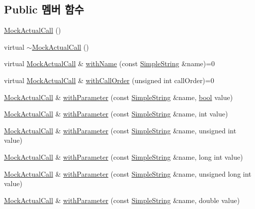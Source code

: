 \subsection*{Public 멤버 함수}
\begin{DoxyCompactItemize}
\item 
\hyperlink{class_mock_actual_call_afe40f29470502ab16ed8ae7b269017fb}{Mock\+Actual\+Call} ()
\item 
virtual \hyperlink{class_mock_actual_call_ae3abdc7c9728cc27056e182953284d1b}{$\sim$\+Mock\+Actual\+Call} ()
\item 
virtual \hyperlink{class_mock_actual_call}{Mock\+Actual\+Call} \& \hyperlink{class_mock_actual_call_a183802278da5087fb62bbdcca7792e36}{with\+Name} (const \hyperlink{class_simple_string}{Simple\+String} \&name)=0
\item 
virtual \hyperlink{class_mock_actual_call}{Mock\+Actual\+Call} \& \hyperlink{class_mock_actual_call_a8ab4e2208020ae51eb1c792082c0eda9}{with\+Call\+Order} (unsigned int call\+Order)=0
\item 
\hyperlink{class_mock_actual_call}{Mock\+Actual\+Call} \& \hyperlink{class_mock_actual_call_a158f3ada8f73127b977d5353d4e4dea0}{with\+Parameter} (const \hyperlink{class_simple_string}{Simple\+String} \&name, \hyperlink{avb__gptp_8h_af6a258d8f3ee5206d682d799316314b1}{bool} value)
\item 
\hyperlink{class_mock_actual_call}{Mock\+Actual\+Call} \& \hyperlink{class_mock_actual_call_abec25d19fe41e8acb31af0130704aa6b}{with\+Parameter} (const \hyperlink{class_simple_string}{Simple\+String} \&name, int value)
\item 
\hyperlink{class_mock_actual_call}{Mock\+Actual\+Call} \& \hyperlink{class_mock_actual_call_ae18a228b6f5e0260c239a22fd94c2353}{with\+Parameter} (const \hyperlink{class_simple_string}{Simple\+String} \&name, unsigned int value)
\item 
\hyperlink{class_mock_actual_call}{Mock\+Actual\+Call} \& \hyperlink{class_mock_actual_call_ac481a5b2a6c2b48d081b88d514f94332}{with\+Parameter} (const \hyperlink{class_simple_string}{Simple\+String} \&name, long int value)
\item 
\hyperlink{class_mock_actual_call}{Mock\+Actual\+Call} \& \hyperlink{class_mock_actual_call_aeb2eccd3b3b4d5820e35401d6daec7b2}{with\+Parameter} (const \hyperlink{class_simple_string}{Simple\+String} \&name, unsigned long int value)
\item 
\hyperlink{class_mock_actual_call}{Mock\+Actual\+Call} \& \hyperlink{class_mock_actual_call_ae2623cd5773f529096615eb84bc2a88d}{with\+Parameter} (const \hyperlink{class_simple_string}{Simple\+String} \&name, double value)

\end{DoxyCompactItemize}

